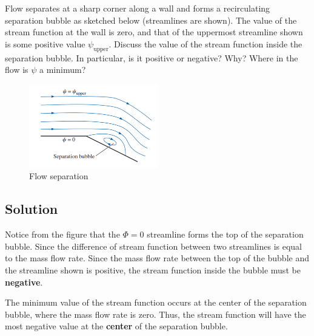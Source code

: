 \section{}


Flow separates at a sharp corner along a wall and forms a recirculating separation bubble as sketched below (streamlines are shown). The value of the stream function at the wall is zero, and that of the uppermost streamline shown is some positive value $\psi_{\text{upper}}$. Discuss the value of the stream function inside the separation bubble. In particular, is it positive or negative? Why? Where in the flow is $\psi$ a minimum?

\begin{figure}[h]
    \centering
    \includegraphics[width=0.5\textwidth]{Questions/Figures/q6 problem diagram.png}
    \caption{Flow separation}
\end{figure}

\subsection*{Solution}
Notice from the figure that the $\Phi = 0$ streamline forms the top of the separation bubble. Since the difference of stream function between two streamlines is equal to the mass flow rate. Since the mass flow rate between the top of the bubble and the streamline shown is positive, the stream function inside the bubble must be \textbf{negative}.

The minimum value of the stream function occurs at the center of the separation bubble, where the mass flow rate is zero. Thus, the stream function will have the most negative value at the \textbf{center} of the separation bubble.